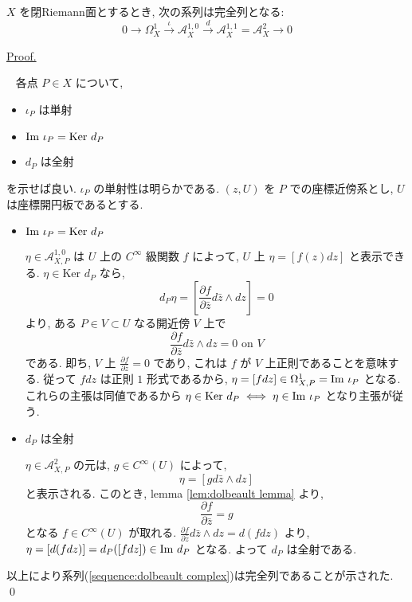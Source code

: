 \documentclass[a4paper,10pt,dvipdfmx]{jsreport}
\newenvironment{prop*}{\refstepcounter{theorem}\begin{itembox}[l]{\underline{Proposition \arabic{chapter}.\arabic{section}.\arabic{theorem}. }}\vspace{-0.5zh}\ }{\end{itembox}}
\renewenvironment{proof}{\begin{flushleft} \underline{Proof.} \end{flushleft}\vspace{-1zh}\ }{\qed\\}
\newcounter{theorem}[section]
\renewcommand{\Im}[1]{{{\rm Im\ }{#1}}}
\renewcommand{\ker}{\textrm{Ker }}
\theoremstyle{definition}
\begin{document}
\begin{prop*}
    \(X\) を閉Riemann面とするとき, 次の系列は完全列となる:
    \begin{equation}
        0 \to \Omega_X^1 \xrightarrow{\iota} \mathcal{A}_X ^{1,0} \xrightarrow{d} \mathcal{A}_X^{1,1} = \mathcal{A}_X^2\to 0 \label{sequence:dolbeault complex}
    \end{equation}
\end{prop*}
\begin{proof}
    各点 \(P\in X\) について,
    \begin{itemize}
        \item \(\iota_P\) は単射
        \item \(\Im \iota_P = \ker d_P\)
        \item \(d_P\) は全射
    \end{itemize}
    を示せば良い. \(\iota_P\) の単射性は明らかである. \((z,U)\) を \(P\) での座標近傍系とし, \(U\) は座標開円板であるとする.
    \begin{itemize}
        \item \(\Im \iota_P = \ker d_P\)
        
        \(\eta \in \mathcal{A}_{X,P} ^{1,0}\) は \(U\) 上の \(C^\infty\) 級関数 \(f\) によって, \(U\) 上 \(\eta = [f(z)dz]\) と表示できる. \(\eta \in \ker d_P\) なら,
        \[
            d_P \eta = \left[ \frac{\partial f}{\partial \bar{z}} d\bar{z} \wedge dz \right] = 0
        \]
        より, ある \(P\in V \subset U\) なる開近傍 \(V\) 上で
        \[
            \frac{\partial f}{\partial \bar{z}} d\bar{z} \wedge dz = 0\textrm{ on }V
        \]
        である. 即ち, \(V\) 上 \(\frac{\partial f}{\partial \bar{z}} = 0\) であり, これは \(f\) が \(V\) 上正則であることを意味する. 従って \(fdz\) は正則 \(1\) 形式であるから, \(\eta = [fdz] \in \Omega_{X,P}^1 = \Im \iota_P\) となる. これらの主張は同値であるから \(\eta \in \ker d_P \iff \eta \in \Im \iota_P\) となり主張が従う.

        \item \(d_P\) は全射
        
        \(\eta \in \mathcal{A}_{X, P}^2\) の元は, \(g\in C^\infty(U)\) によって,
        \[
            \eta = [gd\bar{z} \wedge dz]
        \]
        と表示される. このとき, lemma \ref{lem:dolbeault lemma} より,
        \[
            \frac{\partial f}{\partial \bar{z}} = g
        \]
        となる \(f \in C^\infty(U)\) が取れる. \(\frac{\partial f}{\partial \bar{z}} d\bar{z} \wedge dz = d(fdz)\) より, \(\eta = [d(fdz)] = d_P([fdz])\in \Im d_P\) となる. よって \(d_P\) は全射である.
    \end{itemize}
    以上により系列(\ref{sequence:dolbeault complex})は完全列であることが示された.
\end{proof}
\end{document}
